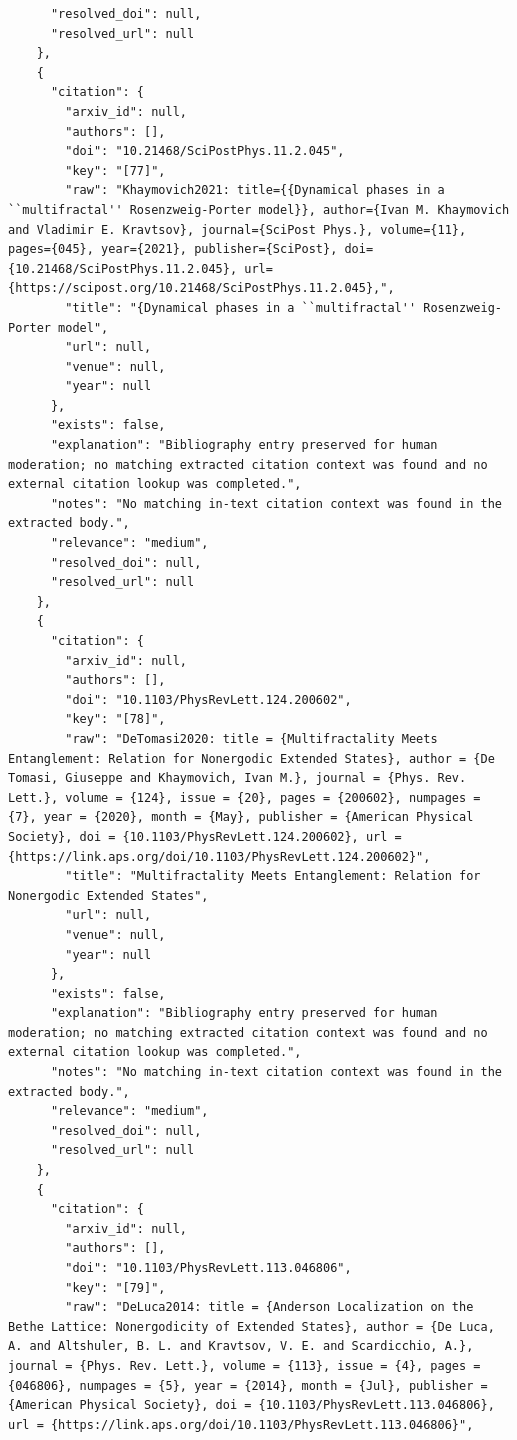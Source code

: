 \documentclass[11pt]{article}
\begin{document}
\begin{verbatim}
      "resolved_doi": null,
      "resolved_url": null
    },
    {
      "citation": {
        "arxiv_id": null,
        "authors": [],
        "doi": "10.21468/SciPostPhys.11.2.045",
        "key": "[77]",
        "raw": "Khaymovich2021: title={{Dynamical phases in a ``multifractal'' Rosenzweig-Porter model}}, author={Ivan M. Khaymovich and Vladimir E. Kravtsov}, journal={SciPost Phys.}, volume={11}, pages={045}, year={2021}, publisher={SciPost}, doi={10.21468/SciPostPhys.11.2.045}, url={https://scipost.org/10.21468/SciPostPhys.11.2.045},",
        "title": "{Dynamical phases in a ``multifractal'' Rosenzweig-Porter model",
        "url": null,
        "venue": null,
        "year": null
      },
      "exists": false,
      "explanation": "Bibliography entry preserved for human moderation; no matching extracted citation context was found and no external citation lookup was completed.",
      "notes": "No matching in-text citation context was found in the extracted body.",
      "relevance": "medium",
      "resolved_doi": null,
      "resolved_url": null
    },
    {
      "citation": {
        "arxiv_id": null,
        "authors": [],
        "doi": "10.1103/PhysRevLett.124.200602",
        "key": "[78]",
        "raw": "DeTomasi2020: title = {Multifractality Meets Entanglement: Relation for Nonergodic Extended States}, author = {De Tomasi, Giuseppe and Khaymovich, Ivan M.}, journal = {Phys. Rev. Lett.}, volume = {124}, issue = {20}, pages = {200602}, numpages = {7}, year = {2020}, month = {May}, publisher = {American Physical Society}, doi = {10.1103/PhysRevLett.124.200602}, url = {https://link.aps.org/doi/10.1103/PhysRevLett.124.200602}",
        "title": "Multifractality Meets Entanglement: Relation for Nonergodic Extended States",
        "url": null,
        "venue": null,
        "year": null
      },
      "exists": false,
      "explanation": "Bibliography entry preserved for human moderation; no matching extracted citation context was found and no external citation lookup was completed.",
      "notes": "No matching in-text citation context was found in the extracted body.",
      "relevance": "medium",
      "resolved_doi": null,
      "resolved_url": null
    },
    {
      "citation": {
        "arxiv_id": null,
        "authors": [],
        "doi": "10.1103/PhysRevLett.113.046806",
        "key": "[79]",
        "raw": "DeLuca2014: title = {Anderson Localization on the Bethe Lattice: Nonergodicity of Extended States}, author = {De Luca, A. and Altshuler, B. L. and Kravtsov, V. E. and Scardicchio, A.}, journal = {Phys. Rev. Lett.}, volume = {113}, issue = {4}, pages = {046806}, numpages = {5}, year = {2014}, month = {Jul}, publisher = {American Physical Society}, doi = {10.1103/PhysRevLett.113.046806}, url = {https://link.aps.org/doi/10.1103/PhysRevLett.113.046806}",

\end{verbatim}
\end{document}
